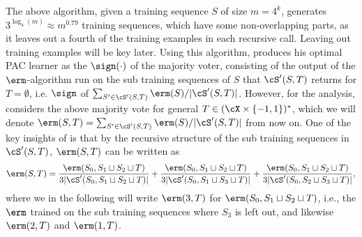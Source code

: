 \vspace{-0.3cm}
The above algorithm, given a training sequence $S$ of size $m=4^{k}$, generates $3^{\log_{4}(m)}\approx m^{0.79}$ training sequences, which have some non-overlapping parts, as it leaves out a fourth of the training examples in each recursive call. Leaving out training examples will be key later. Using this algorithm, 
\citeauthor{hannekeoptimal} produces his optimal PAC learner as the $ \sign(\cdot) $ of the majority voter, consisting of the output of the $\erm$-algorithm run on the sub training sequences of $S$ that $\cS'(S,T)$ returns for $ T=\emptyset $, i.e. $ \sign $ of  $\sum_{S'\in \cS'(S,T)} \erm(S)/|\cS'(S,T)|$. However, for the analysis, \citeauthor{hannekeoptimal} considers the above majority vote for general $ T\in(\cX\times\{-1,1\})^{*} $,  which we will denote $\erm(S,T)=\sum_{S'\in \cS'(S,T)} \erm(S)/|\cS'(S,T)|$ from now on. One of the key insights of \citeauthor{hannekeoptimal} is that by the recursive structure of the sub training sequences in $\cS'(S,T)$, $ \erm(S,T) $ can be written as
\begin{align*}
    \erm(S,T)=\frac{\erm(S_{0},S_{1}\sqcup S_{2}\sqcup T)}{3|\cS'(S_{0},S_{1}\sqcup S_{2}\sqcup T)|}+
\frac{\erm(S_{0},S_{1}\sqcup S_{2}\sqcup T)}{3|\cS'(S_{0},S_{1}\sqcup S_{3}\sqcup T)|}+
\frac{\erm(S_{0},S_{1}\sqcup S_{2}\sqcup T)}{3|\cS'(S_{0},S_{2}\sqcup S_{3}\sqcup T)|},
\end{align*}
where we in the following will write $\erm(3,T)$ for $\erm(S_{0},S_{1}\sqcup S_{2}\sqcup T)$, i.e., the $\erm$ trained on the sub training sequences where $S_{3}$ is left out, and likewise $\erm(2,T)$ and $\erm(1,T)$. 

